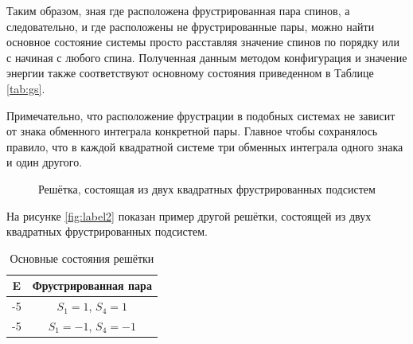 \documentclass[utf8, babel, sor, jor, amsmath,amssymb, reprint]{elsarticle} %
\begin{document}
Таким образом, зная где расположена фрустрированная пара спинов, а следовательно, и где расположены не фрустрированные пары, можно найти основное состояние системы просто расставляя значение спинов по порядку или с начиная с любого спина. Полученная данным методом конфигурация и значение энергии также соответствуют основному состояния приведенном в Таблице \eqref{tab:gs}.

Примечательно, что расположение фрустрации в подобных системах не зависит от знака обменного интеграла конкретной пары. Главное чтобы сохранялось правило, что в каждой квадратной системе три обменных интеграла одного знака и один другого. 

\begin{figure}[h]
	\centering
	\caption{Решётка, состоящая из двух квадратных фрустрированных подсистем}
	\label{fig:label2}
\end{figure}

На рисунке \eqref{fig:label2} показан пример другой решётки, состоящей из двух квадратных фрустрированных подсистем.

\begin{table}[h]
	\centering
	\begin{tabular}{|c|c|}
		\hline
		E   &   Фрустрированная пара \\
		\hline
		-5   &  $S_1=1$, $S_4=1$ \\
		\hline
		-5   &   $S_1=-1$, $S_4=-1$ \\
		\hline
	\end{tabular}
	\caption{Основные состояния решётки}
	\label{tab:gs2}
\end{table}
\end{document}
